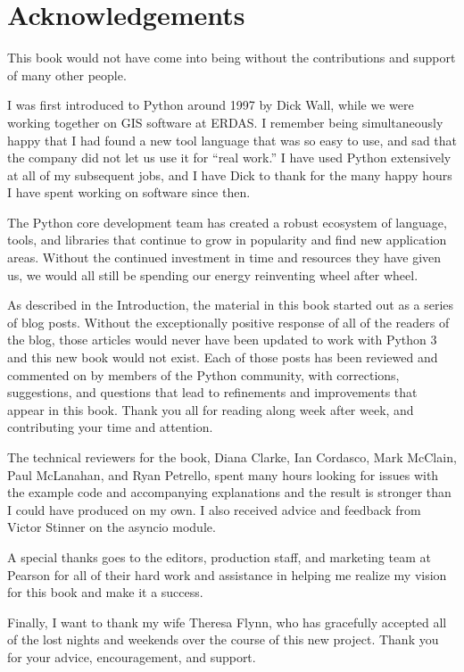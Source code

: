 \cleardoublepage
\chapter*{Acknowledgements}

\noindent This book would not have come into being without the contributions and
support of many other people.

I was first introduced to Python around 1997 by Dick Wall, while we
were working together on GIS software at ERDAS. I remember being
simultaneously happy that I had found a new tool language that was so
easy to use, and sad that the company did not let us use it for ``real
work.'' I have used Python extensively at all of my subsequent jobs,
and I have Dick to thank for the many happy hours I have spent working
on software since then.

The Python core development team has created a robust ecosystem of
language, tools, and libraries that continue to grow in popularity and
find new application areas. Without the continued investment in time
and resources they have given us, we would all still be spending our
energy reinventing wheel after wheel.

As described in the Introduction, the material in this book started
out as a series of blog posts. Without the exceptionally positive
response of all of the readers of the blog, those articles would never
have been updated to work with Python 3 and this new book would not
exist. Each of those posts has been reviewed and commented on by
members of the Python community, with corrections, suggestions, and
questions that lead to refinements and improvements that appear in
this book. Thank you all for reading along week after week, and
contributing your time and attention.

The technical reviewers for the book, Diana Clarke, Ian Cordasco, Mark
McClain, Paul McLanahan, and Ryan Petrello, spent many hours looking
for issues with the example code and accompanying explanations and the
result is stronger than I could have produced on my own. I also
received advice and feedback from Victor Stinner on the asyncio
module.

A special thanks goes to the editors, production staff, and marketing
team at Pearson for all of their hard work and assistance in helping
me realize my vision for this book and make it a success.

Finally, I want to thank my wife Theresa Flynn, who has gracefully
accepted all of the lost nights and weekends over the course of this
new project. Thank you for your advice, encouragement, and support.
